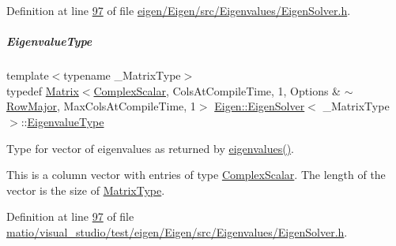 Definition at line \hyperlink{eigen_2_eigen_2src_2_eigenvalues_2_eigen_solver_8h_source_l00097}{97} of file \hyperlink{eigen_2_eigen_2src_2_eigenvalues_2_eigen_solver_8h_source}{eigen/\+Eigen/src/\+Eigenvalues/\+Eigen\+Solver.\+h}.

\mbox{\label{group___eigenvalues___module_adc446bcb60572758fa64515f2825db62}} 
\subparagraph{\texorpdfstring{Eigenvalue\+Type}{EigenvalueType}\hspace{0.1cm}{\footnotesize\ttfamily [2/2]}}
{\footnotesize\ttfamily template$<$typename \+\_\+\+Matrix\+Type$>$ \\
typedef \hyperlink{group___core___module_class_eigen_1_1_matrix}{Matrix}$<$\hyperlink{group___eigenvalues___module_a4d0b2a773357d0a6ec98e026f04002ed}{Complex\+Scalar}, Cols\+At\+Compile\+Time, 1, Options \& $\sim$\hyperlink{group__enums_ggaacded1a18ae58b0f554751f6cdf9eb13acfcde9cd8677c5f7caf6bd603666aae3}{Row\+Major}, Max\+Cols\+At\+Compile\+Time, 1$>$ \hyperlink{group___eigenvalues___module_class_eigen_1_1_eigen_solver}{Eigen\+::\+Eigen\+Solver}$<$ \+\_\+\+Matrix\+Type $>$\+::\hyperlink{group___eigenvalues___module_adc446bcb60572758fa64515f2825db62}{Eigenvalue\+Type}}



Type for vector of eigenvalues as returned by \hyperlink{group___eigenvalues___module_a114189009e42f5e03372a7a3dfa33b97}{eigenvalues()}. 

This is a column vector with entries of type \hyperlink{group___eigenvalues___module_a4d0b2a773357d0a6ec98e026f04002ed}{Complex\+Scalar}. The length of the vector is the size of \hyperlink{group___eigenvalues___module_a83acd180404ddaac8a678fa65a6b632b}{Matrix\+Type}. 

Definition at line \hyperlink{matio_2visual__studio_2test_2eigen_2_eigen_2src_2_eigenvalues_2_eigen_solver_8h_source_l00097}{97} of file \hyperlink{matio_2visual__studio_2test_2eigen_2_eigen_2src_2_eigenvalues_2_eigen_solver_8h_source}{matio/visual\+\_\+studio/test/eigen/\+Eigen/src/\+Eigenvalues/\+Eigen\+Solver.\+h}.

